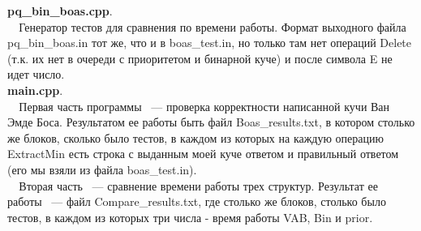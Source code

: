\documentclass[12pt]{article}
\begin{document}
	\textbf{pq\_bin\_boas.cpp}.\\
	\verb'  'Генератор тестов для сравнения по времени работы. Формат выходного файла pq\_bin\_boas.in тот же, что и в boas\_test.in, но только там нет операций Delete (т.к. их нет в очереди с приоритетом и бинарной куче) и после символа E не идет число.\\
	\textbf{main.cpp}.\\
	\verb'  'Первая часть программы ~--- проверка корректности написанной кучи Ван Эмде Боса. Результатом ее работы быть файл Boas\_results.txt, в котором столько же блоков, сколько было тестов, в каждом из которых на каждую операцию ExtractMin есть строка с выданным моей куче ответом и правильный ответом (его мы взяли из файла boas\_test.in).\\
	\verb'  'Вторая часть ~--- сравнение времени работы трех структур. Результат ее работы ~--- файл Compare\_results.txt, где столько же блоков, столько было тестов, в каждом из которых три числа - время работы VAB, Bin и prior.
	
	
\end{document}
